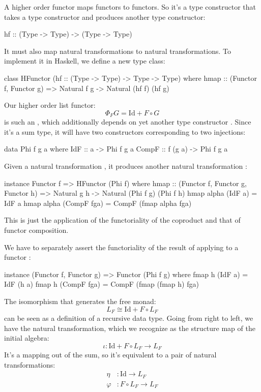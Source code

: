 \documentclass[DaoFP]{subfiles}
\begin{document}
A higher order functor maps functors to functors. So it's a type constructor that takes a type constructor and produces another type constructor:
\begin{haskell}
hf :: (Type -> Type) -> (Type -> Type)
\end{haskell}
It must also map natural transformations to natural transformations. To implement it in Haskell, we define a new type class:
\begin{haskell}
class HFunctor (hf :: (Type -> Type) -> Type -> Type) where
   hmap :: (Functor f, Functor g) => 
       Natural f g -> Natural (hf f) (hf g)
\end{haskell}

Our higher order list functor:
\[ \Phi_F G = \text{Id} + F \circ G \]
is such an , which additionally depends on yet another type constructor . Since it's a sum type, it will have two constructors corresponding to two injections:
\begin{haskell}
data Phi f g a where
   IdF :: a -> Phi f g a
   CompF :: f (g a) -> Phi f g a
\end{haskell}
Given a natural transformation , it produces another natural transformation :
\begin{haskell}
instance Functor f => HFunctor (Phi f) where
   hmap :: (Functor f, Functor g, Functor h) =>
          Natural g h -> Natural (Phi f g) (Phi f h)
   hmap alpha (IdF a) = IdF a
   hmap alpha (CompF fga) = CompF (fmap alpha fga)
\end{haskell}
This is just the application of the functoriality of the coproduct and that of functor composition.

We have to separately assert the functoriality of the result of applying  to a functor :
\begin{haskell}
instance (Functor f, Functor g) => Functor (Phi f g) where
   fmap h (IdF a) = IdF (h a)
   fmap h (CompF fga) = CompF (fmap (fmap h) fga)
\end{haskell}



The isomorphism that generates the free monad:
\[ L_F \cong \text{Id} + F \circ L_F \]
can be seen as a definition of a recursive data type. Going from right to left, we have the natural transformation, which we recognize as the structure map of the initial algebra:
\[\iota \colon \text{Id} + F \circ L_F \to L_F\]
It's a mapping out of the sum, so it's equivalent to a pair of natural transformations:
\begin{align*}
\eta &\colon \text{Id} \to L_F
\\
\varphi &\colon F \circ L_F \to L_F
\end{align*}
\end{document}
